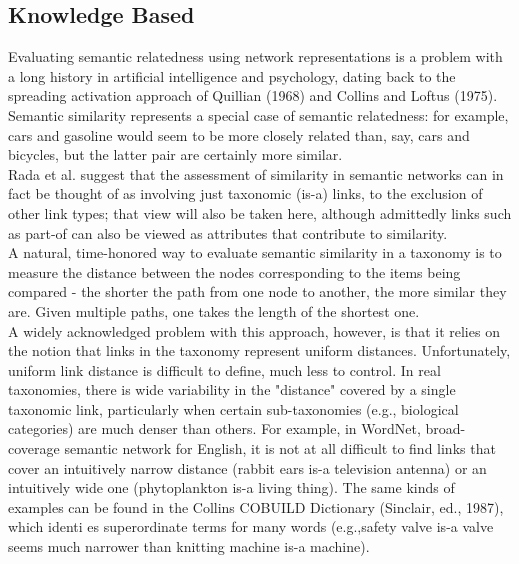 \subsection{Knowledge Based}
\label {knowledge}
Evaluating semantic relatedness using network representations is a problem with a long history in artificial intelligence and psychology, dating back to the spreading activation approach of Quillian (1968) and Collins and Loftus (1975). Semantic similarity represents a special case of semantic relatedness: for example, cars and gasoline would seem to be more closely related than, say, cars and bicycles, but the latter pair are certainly more similar.\\
Rada et al.\citep{rada1989development} suggest that the assessment of similarity in semantic networks can in fact be thought of as involving just taxonomic (is-a) links, to the exclusion of other link types; that view will also be taken here, although admittedly links such as part-of can also be viewed as attributes that contribute to similarity.\\
    A natural, time-honored way to evaluate semantic similarity in a taxonomy is to measure the distance between the nodes corresponding to the items being compared - the shorter the path from one node to another, the more similar they are. Given multiple paths, one takes the length of the shortest one.\\
    A widely acknowledged problem with this approach, however, is that it relies on the notion that links in the taxonomy represent uniform distances. Unfortunately, uniform link distance is difficult to define, much less to control. In real taxonomies, there is wide variability in the "distance" covered by a single taxonomic link, particularly when certain sub-taxonomies (e.g., biological categories) are much denser than others. For example, in WordNet, broad-coverage semantic network for English, it is not at all difficult to find links that cover an intuitively narrow distance (rabbit ears is-a television antenna) or an intuitively wide one (phytoplankton is-a living thing). The same kinds of examples can be found in the Collins COBUILD Dictionary (Sinclair, ed., 1987), which identi es superordinate terms for many words (e.g.,safety valve is-a valve seems much narrower than knitting machine is-a machine)\citep{semantic_2}.\\


